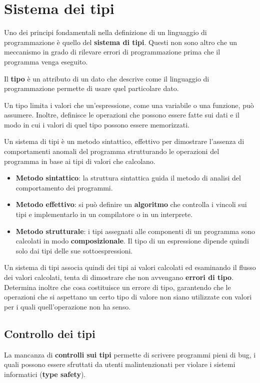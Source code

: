 \section{Sistema dei tipi}
Uno dei principi fondamentali nella definizione di un linguaggio di programmazione è quello del \textbf{sistema di tipi}.
Questi non sono altro che un meccanismo in grado di rilevare errori di programmazione prima che il programma venga eseguito.

Il \textbf{tipo} è un attributo di un dato che descrive come il linguaggio di programmazione permette di usare quel
particolare dato.

Un tipo limita i valori che un'espressione, come una variabile o una funzione, può assumere. Inoltre, definisce le
operazioni che possono essere fatte sui dati e il modo in cui i valori di quel tipo possono essere memorizzati.

Un sistema di tipi è un metodo sintattico, effettivo per dimostrare l'assenza di comportamenti anomali del programma
strutturando le operazioni del programma in base ai tipi di valori che calcolano.
\begin{itemize}
	\item \textbf{Metodo sintattico}: la struttura sintattica guida il metodo di analisi del comportamento dei programmi.
	\item \textbf{Metodo effettivo}: si può definire un \textbf{algoritmo} che controlla i vincoli sui tipi e implementarlo
	      in un compilatore o in un interprete.
	\item \textbf{Metodo strutturale}: i tipi assegnati alle componenti di un programma sono calcolati in modo
	      \textbf{composizionale}. Il tipo di un espressione dipende quindi solo dai tipi delle sue sottoespressioni.
\end{itemize}
Un sistema di tipi associa quindi dei tipi ai valori calcolati ed esaminando il flusso dei valori calcolati, tenta di
dimostrare che non avvengano \textbf{errori di tipo}. Determina inoltre che cosa costituisce un errore di tipo, garantendo
che le operazioni che si aspettano un certo tipo di valore non siano utilizzate con valori per i quali quell'operazione non
ha senso.

\subsection{Controllo dei tipi}
La mancanza di \textbf{controlli sui tipi} permette di scrivere programmi pieni di bug, i quali possono essere sfruttati da
utenti malintenzionati per violare i sistemi informatici (\textbf{type safety}).

